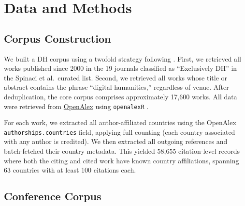 \documentclass[twoside]{article}
\begin{document}

\section{Data and Methods}
\subsection{Corpus Construction}

We built a DH corpus using a twofold strategy following \textcite{spinaci2022}. First, we retrieved all works published since 2000 in the 19 journals classified as ``Exclusively DH'' in the Spinaci et al.\ curated list. Second, we retrieved all works whose title or abstract contains the phrase ``digital humanities,'' regardless of venue. After deduplication, the core corpus comprises approximately 17,600 works. All data were retrieved from \href{https://openalex.org/}{OpenAlex} \parencite{priem2022} using \texttt{openalexR} \parencite{aria2024}.

For each work, we extracted all author-affiliated countries using the OpenAlex \texttt{authorships.countries} field, applying full counting (each country associated with any author is credited). We then extracted all outgoing references and batch-fetched their country metadata. This yielded 58,655 citation-level records where both the citing and cited work have known country affiliations, spanning 63 countries with at least 100 citations each.

\subsection{Conference Corpus}
\end{document}
